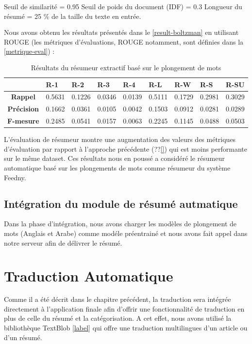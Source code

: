 Seuil de similarité = 0.95
Seuil de poids du document (IDF) = 0.3
Longueur du résumé = 25 \% de la taille du texte en entrée.

Nous avons obtenu les résultats présentés dans le \autoref{result-boltzman} en utilisant ROUGE (les métriques d'évaluations, ROUGE notamment, sont définies dans la \autoref{metrique-eval}) : 

\begin{table}[H]
    \begin{center}
        \begin{tabular}{|c|C{1.2cm}|C{1.2cm}|C{1.2cm}|C{1.2cm}|C{1.2cm}|C{1.2cm}|C{1.2cm}|C{1.2cm}|}
             & \textbf{R-1} &  \textbf{R-2} &  \textbf{R-3} &  \textbf{R-4} &  \textbf{R-L} &  \textbf{R-W} &  \textbf{R-S} &  \textbf{R-SU} \\
            \hline
            \textbf{Rappel} & 0.5631 & 0.1226 & 0.0346 & 0.0139 & 0.5111 & 0.1729 & 0.2981 & 0.3029 \\
            \textbf{Précision} & 0.1662 & 0.0361 & 0.0105 & 0.0042 & 0.1503 & 0.0912 & 0.0281 & 0.0289 \\
            \textbf{F-mesure} & 0.2485 & 0.0541 & 0.0157 & 0.0063 & 0.2245 & 0.1145 & 0.0488 & 0.0503 \\
            \hline
        \end{tabular}
    \end{center}
    \caption{Résultats du résumeur extractif basé sur le plongement de mots}
    \label{result-boltzman}
\end{table}
L'évaluation de résumeur montre une augmentation des valeurs des métriques d'évaluation par rapport à l'approche précédente (??\autoref{}) qui est moins performante sur le même dataset. Ces résultats nous en poussé a considéré le résumeur automatique basé sur les plongements de mots comme résumeur du système \textquotedbl Feedny\textquotedbl.

\subsection{Intégration du module de résumé autmatique}
Dans la phase d'intégration, nous avons charger les modèles de plongement de mots (Anglais et Arabe) comme modéle préentrainé et nous avons fait appel dans notre serveur afin de délivrer le résumé.


\section{Traduction Automatique}
Comme il a été décrit dans le chapitre précédent, la traduction sera intégrée directement à l'application finale afin d'offrir une fonctionnalité de traduction en plus de celle du résumé et la catégorisation. A cet effet, nous avons utilisé la bibliothèque TextBlob \autoref{label} qui offre une traduction multilingues d'un article ou d'un résumé.


